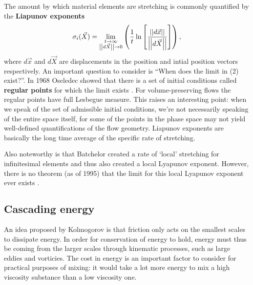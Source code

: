 \documentclass[a4paper,12pt]{article}
\begin{document}
The amount by which material elements are stretching is commonly quantified by the \textbf{Liapunov exponents}
\begin{align}
\sigma _i (\vec{X})= \lim_{\substack{t \to \infty\\ \left|\left|d\vec{X}\right|\right| \to 0}}\left(\frac{1}{t}\ln\left[\frac{\left|\left|d\vec{x}\right|\right|}{\left|\left|d\vec{X}\right|\right|}\right]\right),
\end{align} where $d\vec{x}$ and $d\vec{X}$ are displacements in the position and intial position vectors respectively. An important question to consider is ``When does the limit in (2) exist?''. In 1968 Oseledec showed that there is a set of initial conditions called \textbf{regular points} for which the limit exists \citep{o68}. For volume-preserving flows the regular points have full Lesbegue measure. This raises an interesting point: when we speak of the set of admissible initial conditions, we're not necessarily speaking of the entire space itself, for some of the points in the phase space may not yield well-defined quantifications of the flow geometry. Liapunov exponents are basically the long time average of the specific rate of stretching.

Also noteworthy is that Batchelor created a rate of `local' stretching for infinitesimal elements and thus also created a local Lyapunov exponent. However, there is no theorem (as of 1995) that the limit for this local Lyapunov exponent ever exists \citep[~p.295]{tk95}. 

\subsection{Cascading energy} 

An idea proposed by Kolmogorov is that friction only acts on the smallest scales to dissipate energy. In order for conservation of energy to hold, energy must thus be coming from the larger scales through kinematic processes, such as large eddies and vorticies. The cost in energy is an important factor to consider for practical purposes of mixing: it would take a lot more energy to mix a high viscosity substance than a low viscosity one. 
\end{document}
